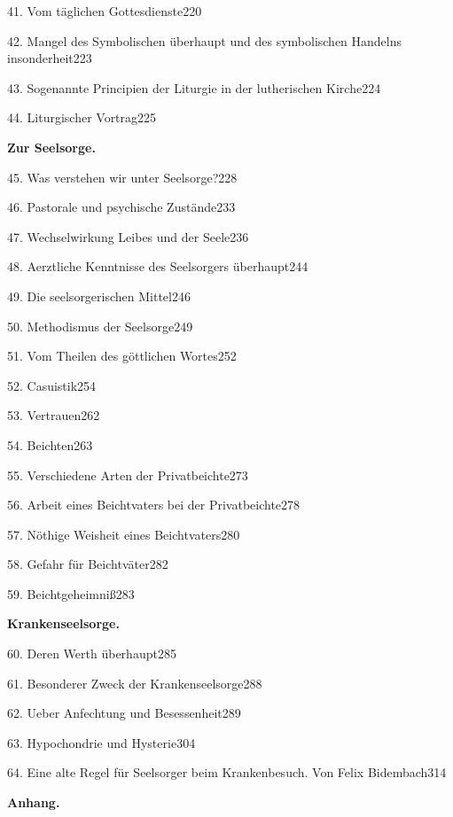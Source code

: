 41. Vom täglichen Gottesdienste\hfill 220

42. Mangel des Symbolischen überhaupt und des symbolischen Handelns insonderheit\hfill 223

43. Sogenannte Principien der Liturgie in der lutherischen Kirche\hfill 224

44. Liturgischer Vortrag\hfill 225

\par\medskip\noindent\textbf{Zur Seelsorge.}\par\nopagebreak

45. Was verstehen wir unter Seelsorge?\hfill 228

46. Pastorale und psychische Zustände\hfill 233

47. Wechselwirkung Leibes und der Seele\hfill 236

48. Aerztliche Kenntnisse des Seelsorgers überhaupt\hfill 244

49. Die seelsorgerischen Mittel\hfill 246

50. Methodismus der Seelsorge\hfill 249

51. Vom Theilen des göttlichen Wortes\hfill 252

52. Casuistik\hfill 254

53. Vertrauen\hfill 262

54. Beichten\hfill 263

55. Verschiedene Arten der Privatbeichte\hfill 273

56. Arbeit eines Beichtvaters bei der Privatbeichte\hfill 278

57. Nöthige Weisheit eines Beichtvaters\hfill 280

58. Gefahr für Beichtväter\hfill 282

59. Beichtgeheimniß\hfill 283

\par\medskip\noindent\textbf{Krankenseelsorge.}\par\nopagebreak

60. Deren Werth überhaupt\hfill 285

61. Besonderer Zweck der Krankenseelsorge\hfill 288

62. Ueber Anfechtung und Besessenheit\hfill 289

63. Hypochondrie und Hysterie\hfill 304

64. Eine alte Regel für Seelsorger beim Krankenbesuch. Von Felix Bidembach\hfill 314

\par\medskip\noindent\textbf{Anhang.}\par\nopagebreak

